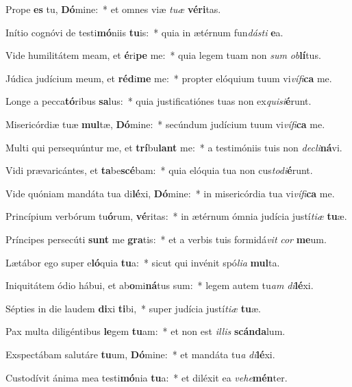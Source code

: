 \item Prope \textbf{es} tu, \textbf{Dó}mine:~* et omnes viæ \textit{tu}\textit{æ} \textbf{vé}\textbf{ri}tas.
\item Inítio cognóvi de testi\textbf{mó}niis \textbf{tu}is:~* quia in ætérnum fun\textit{dás}\textit{ti} \textbf{e}a.
\item Vide humilitátem meam, et \textbf{é}ri\textbf{pe} me:~* quia legem tuam non \textit{sum} \textit{ob}\textbf{lí}tus.
\item Júdica judícium meum, et \textbf{réd}i\textbf{me} me:~* propter elóquium tuum vi\textit{ví}\textit{fi}\textbf{ca} me.
\item Longe a pecca\textbf{tó}ribus \textbf{sa}lus:~* quia justificatiónes tuas non ex\textit{qui}\textit{si}\textbf{é}runt.
\item Misericórdiæ tuæ \textbf{mul}tæ, \textbf{Dó}mine:~* secúndum judícium tuum vi\textit{ví}\textit{fi}\textbf{ca} me.
\item Multi qui persequúntur me, et \textbf{trí}bu\textbf{lant} me:~* a testimóniis tuis non \textit{de}\textit{cli}\textbf{ná}vi.
\item Vidi prævaricántes, et \textbf{ta}be\textbf{scé}bam:~* quia elóquia tua non cus\textit{to}\textit{di}\textbf{é}runt.
\item Vide quóniam mandáta tua di\textbf{lé}xi, \textbf{Dó}mine:~* in misericórdia tua vi\textit{ví}\textit{fi}\textbf{ca} me.
\item Princípium verbórum tu\textbf{ó}rum, \textbf{vé}ritas:~* in ætérnum ómnia judícia justí\textit{ti}\textit{æ} \textbf{tu}æ.
\item Príncipes persecúti \textbf{sunt} me \textbf{gra}tis:~* et a verbis tuis formidá\textit{vit} \textit{cor} \textbf{me}um.
\item Lætábor ego super e\textbf{ló}quia \textbf{tu}a:~* sicut qui invénit spó\textit{li}\textit{a} \textbf{mul}ta.
\item Iniquitátem ódio hábui, et ab\textbf{o}mi\textbf{ná}tus sum:~* legem autem tu\textit{am} \textit{di}\textbf{lé}xi.
\item Sépties in die laudem \textbf{di}xi \textbf{ti}bi,~* super judícia justí\textit{ti}\textit{æ} \textbf{tu}æ.
\item Pax multa diligéntibus \textbf{le}gem \textbf{tu}am:~* et non est \textit{il}\textit{lis} \textbf{scán}\textbf{da}lum.
\item Exspectábam salutáre \textbf{tu}um, \textbf{Dó}mine:~* et mandáta tu\textit{a} \textit{di}\textbf{lé}xi.
\item Custodívit ánima mea testi\textbf{mó}nia \textbf{tu}a:~* et diléxit ea \textit{ve}\textit{he}\textbf{mén}ter.
